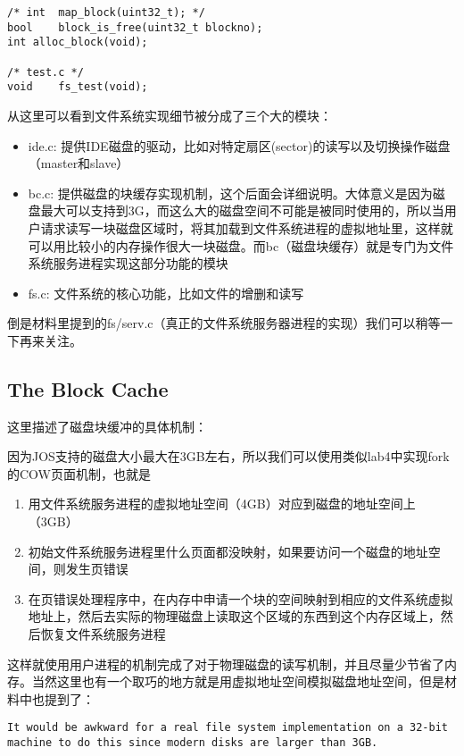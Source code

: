 \documentclass{article}
\begin{document}
\begin{CJK*}{UTF8}{gkai}
\begin{lstlisting}[style=ccode, title={\scriptsize \ttfamily \bfseries fs/fs.h}]
/* int	map_block(uint32_t); */
bool	block_is_free(uint32_t blockno);
int	alloc_block(void);

/* test.c */
void	fs_test(void);
\end{lstlisting}

从这里可以看到文件系统实现细节被分成了三个大的模块：

\begin{itemize}
\item{ide.c: 提供IDE磁盘的驱动，比如对特定扇区(sector)的读写以及切换操作磁盘（master和slave）}
\item{bc.c: 提供磁盘的块缓存实现机制，这个后面会详细说明。大体意义是因为磁盘最大可以支持到3G，而这么大的磁盘空间不可能是被同时使用的，所以当用户请求读写一块磁盘区域时，将其加载到文件系统进程的虚拟地址里，这样就可以用比较小的内存操作很大一块磁盘。而bc（磁盘块缓存）就是专门为文件系统服务进程实现这部分功能的模块}
\item{fs.c: 文件系统的核心功能，比如文件的增删和读写}
\end{itemize}

倒是材料里提到的fs/serv.c（真正的文件系统服务器进程的实现）我们可以稍等一下再来关注。

\subsection{The Block Cache}

这里描述了磁盘块缓冲的具体机制：

因为JOS支持的磁盘大小最大在3GB左右，所以我们可以使用类似lab4中实现fork的COW页面机制，也就是

\begin{enumerate}
\item{用文件系统服务进程的虚拟地址空间（4GB）对应到磁盘的地址空间上（3GB）}
\item{初始文件系统服务进程里什么页面都没映射，如果要访问一个磁盘的地址空间，则发生页错误}
\item{在页错误处理程序中，在内存中申请一个块的空间映射到相应的文件系统虚拟地址上，然后去实际的物理磁盘上读取这个区域的东西到这个内存区域上，然后恢复文件系统服务进程}
\end{enumerate}

这样就使用用户进程的机制完成了对于物理磁盘的读写机制，并且尽量少节省了内存。当然这里也有一个取巧的地方就是用虚拟地址空间模拟磁盘地址空间，但是材料中也提到了：

\begin{lstlisting}[style=exercise]
It would be awkward for a real file system implementation on a 32-bit machine to do this since modern disks are larger than 3GB.
\end{lstlisting}


\end{CJK*}
\end{document}
